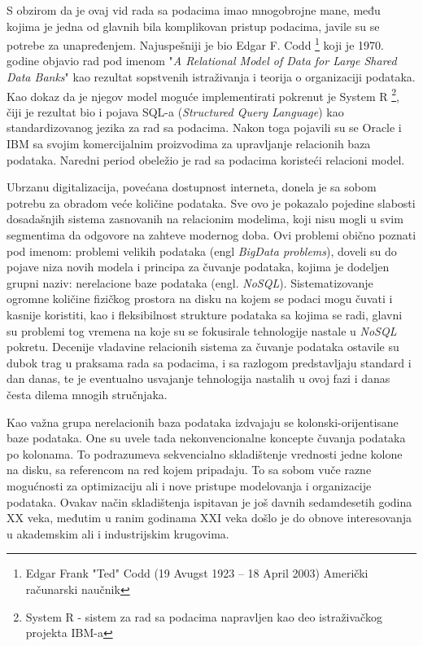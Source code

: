 \documentclass[12pt,oneside]{memoir}
\begin{document}
S obzirom da je ovaj vid rada sa podacima imao mnogobrojne mane, među kojima je jedna od glavnih bila komplikovan pristup podacima, javile su se potrebe za unapređenjem. Najuspešniji je bio Edgar F. Codd \footnote{Edgar Frank "Ted" Codd (19 Avugst 1923 – 18 April 2003) Američki računarski naučnik }  koji je 1970. godine objavio rad pod imenom "\textit{A Relational Model of Data for Large Shared Data Banks}" kao rezultat sopstvenih istraživanja i teorija o organizaciji podataka.  Kao dokaz da je njegov model moguće implementirati pokrenut je System R \footnote{System R - sistem za rad sa podacima napravljen kao deo istraživačkog projekta IBM-a}, čiji je rezultat bio i pojava SQL-a (\textit{Structured Query Language}) kao standardizovanog jezika za rad sa podacima. Nakon toga pojavili su se Oracle i IBM sa svojim komercijalnim proizvodima za upravljanje relacionih baza podataka. Naredni period obeležio je rad sa podacima koristeći relacioni model.  

Ubrzanu digitalizacija, povećana dostupnost interneta, donela je sa sobom potrebu za obradom veće količine podataka. Sve ovo je pokazalo pojedine slabosti dosadašnjih sistema zasnovanih na relacionim modelima, koji nisu mogli u svim segmentima da odgovore na zahteve modernog doba. Ovi problemi obično poznati pod imenom: problemi velikih podataka (engl \textit{BigData problems}), doveli su do pojave niza novih modela i principa za čuvanje podataka, kojima je dodeljen  grupni naziv: nerelacione baze podataka (engl. \textit{NoSQL}).
Sistematizovanje ogromne količine fizičkog prostora na disku na kojem se podaci mogu čuvati i kasnije koristiti, kao i fleksibilnost strukture podataka sa kojima se radi, glavni su problemi tog vremena na koje su se fokusirale tehnologije nastale u \textit{NoSQL} pokretu.
Decenije vladavine  relacionih sistema za čuvanje podataka ostavile su dubok trag u praksama rada sa podacima, i sa razlogom predstavljaju standard i dan danas, te je eventualno usvajanje tehnologija nastalih u ovoj fazi i danas česta dilema mnogih stručnjaka. 

Kao važna grupa nerelacionih baza podataka izdvajaju se kolonski-orijentisane baze podataka. One su uvele tada nekonvencionalne koncepte čuvanja podataka po kolonama. To podrazumeva sekvencialno skladištenje vrednosti jedne kolone na disku, sa referencom na red kojem pripadaju. To sa sobom vuče razne mogućnosti za optimizaciju ali i nove pristupe modelovanja i organizacije podataka. Ovakav način skladištenja ispitavan je još davnih sedamdesetih godina XX veka, međutim u ranim godinama XXI veka došlo je do obnove interesovanja u akademskim ali i industrijskim krugovima. 
\end{document}
